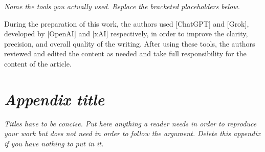 \documentclass[12pt]{article}
\newcommand{\inst}[1]{\textit{#1}}
\begin{document}
\inst{Name the tools you actually used. Replace the bracketed placeholders below.}

During the preparation of this work, the authors used [ChatGPT] and [Grok], developed
by [OpenAI] and [xAI] respectively, in order to improve the clarity, precision, and
overall quality of the writing. After using these tools, the authors reviewed and
edited the content as needed and take full responsibility for the content of the
article.






\appendix

\section{\inst{Appendix title}}

\inst{Titles have to be concise. Put here anything a reader needs in order to
reproduce your work but does not need in order to follow the argument. Delete this
appendix if you have nothing to put in it.}
\end{document}

